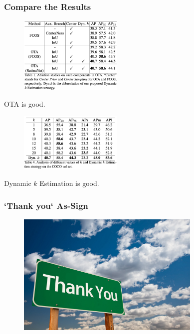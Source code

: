 \documentclass[slidetop, mathserif, dvipsnames]{beamer}
\begin{document}
\begin{frame}
    \frametitle{Compare the Results}

    \begin{minipage}{5cm}
    \begin{figure}
        \includegraphics[width=140pt]{pics/ota_compare1.png}
    \end{figure}
    OTA is good.
    \end{minipage}
    \begin{minipage}{5cm}
    \begin{figure}
        \includegraphics[width=140pt]{pics/ota_compare2.png}
    \end{figure}
    Dynamic $k$ Estimation is good.

    \quad

    \quad

    \end{minipage}

\end{frame}

\begin{frame}
    \frametitle{`Thank you` As-Sign}

    \begin{figure}
        \includegraphics[width=250pt]{pics/thank-you-road-sign1.jpeg}
    \end{figure}

\end{frame}
\end{document}
